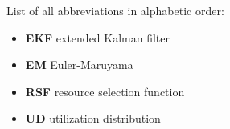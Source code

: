 
List of all abbreviations in alphabetic order:

\begin{itemize}
    \item \textbf{EKF} extended Kalman filter
    \item \textbf{EM} Euler-Maruyama
    \item \textbf{RSF} resource selection function
    \item \textbf{UD} utilization distribution
    
    
\end{itemize}